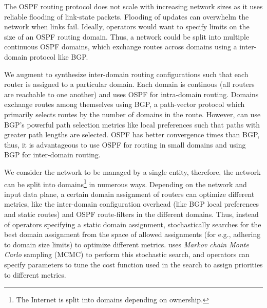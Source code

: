The OSPF routing protocol does not scale 
with increasing network sizes
as it uses reliable
flooding of link-state packets. Flooding 
of updates can  
overwhelm the network when links fail. 
Ideally, operators would want to specify
limits on the size of an OSPF routing domain. 
Thus, a network could be 
split into multiple continuous OSPF domains,
which exchange routes across domains using
a inter-domain protocol like BGP.

We augment \name to synthesize 
inter-domain routing configurations 
such that each router is assigned to
a particular domain. 
Each domain is continous (all routers
are reachable to one another) and 
uses OSPF for intra-domain routing.
Domains exchange routes among  
themselves using BGP, a path-vector 
protocol which primarily selects routes by 
the number of domains in the route. 
However, \name can 
use BGP's powerful path selection metrics 
like local preferences such that  
paths with greater path lengths are selected.
OSPF has better convergence times than BGP,
thus, it is advantageous to use OSPF for 
routing in small domains and using BGP for
inter-domain routing. 

We consider the network to be managed by a 
single entity, therefore, the network can 
be split into domains\footnote{
The Internet is split into domains depending 
on ownership.} in numerous ways. Depending
on the network and input data plane, a certain
domain assignment of routers 
can optimize different metrics, like the
inter-domain configuration overhead (like BGP local
preferences and static routes) and OSPF route-filters
in the different domains. Thus, instead of operators
specifying a static domain assignment, \name stochastically
searches for the best domain assignment from the space of 
allowed assignments (for e.g., adhering to domain size limits)
to optimize different metrics. \name uses 
\emph{Markov chain Monte Carlo} sampling (MCMC) to perform
this stochastic search, and operators can specify parameters
to tune the cost function used in the search to assign priorities
to different metrics. 








